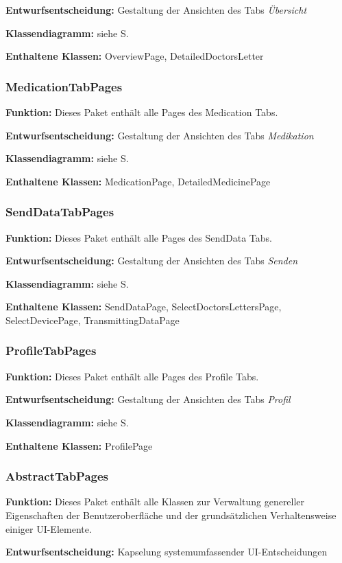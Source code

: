 \documentclass[a4paper]{scrreprt}
\begin{document}
\textbf{Entwurfsentscheidung:} Gestaltung der Ansichten des Tabs \textit{Übersicht}

\textbf{Klassendiagramm:} siehe S.

\textbf{Enthaltene Klassen:} OverviewPage, DetailedDoctorsLetter

\subsubsection{MedicationTabPages}
\textbf{Funktion:} Dieses Paket enthält alle Pages des Medication Tabs.

\textbf{Entwurfsentscheidung:} Gestaltung der Ansichten des Tabs \textit{Medikation}

\textbf{Klassendiagramm:} siehe S.

\textbf{Enthaltene Klassen:} MedicationPage, DetailedMedicinePage

\subsubsection{SendDataTabPages}
\textbf{Funktion:} Dieses Paket enthält alle Pages des SendData Tabs.

\textbf{Entwurfsentscheidung:} Gestaltung der Ansichten des Tabs \textit{Senden}

\textbf{Klassendiagramm:} siehe S.

\textbf{Enthaltene Klassen:} SendDataPage, SelectDoctorsLettersPage, SelectDevicePage, TransmittingDataPage

\subsubsection{ProfileTabPages}
\textbf{Funktion:} Dieses Paket enthält alle Pages des Profile Tabs.

\textbf{Entwurfsentscheidung:} Gestaltung der Ansichten des Tabs \textit{Profil}

\textbf{Klassendiagramm:} siehe S.

\textbf{Enthaltene Klassen:} ProfilePage

\subsubsection{AbstractTabPages}
\textbf{Funktion:} Dieses Paket enthält alle Klassen zur Verwaltung genereller Eigenschaften der Benutzeroberfläche und der grundsätzlichen Verhaltensweise einiger UI-Elemente.

\textbf{Entwurfsentscheidung:} Kapselung systemumfassender UI-Entscheidungen
\end{document}
